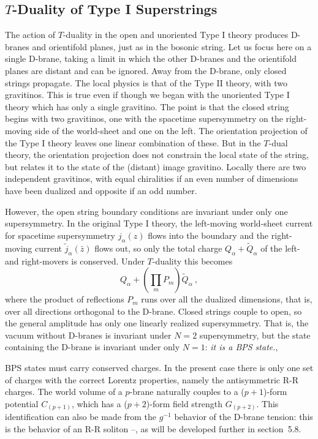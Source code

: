 \documentclass[12pt]{article}
\def\be{\begin{equation}}
\def\ee{\end{equation}}
\begin{document}
\subsection{$T$-Duality of Type I Superstrings}

The action of $T$-duality in the open and unoriented Type I theory
produces D-branes and orientifold planes, just as in the bosonic string. 
Let us focus here on a single D-brane, taking a limit
in which the other D-branes and the orientifold planes are
distant and can be ignored.  Away from the D-brane, only closed strings
propagate.  The local physics is that of the Type II theory, with two
gravitinos.  This is true even if though we began with the unoriented Type
I theory which has only a single gravitino.  The point is that the closed
string begins with two gravitinos, one with the spacetime
supersymmetry on the right-moving side of the world-sheet and one on the
left.  The orientation projection of the Type I theory leaves one linear
combination of these.  But in the $T$-dual theory, the
orientation projection does not constrain the local state of the string,
but relates it to the state of the (distant) image gravitino.
Locally there are two independent gravitinos, with equal chiralities if an
even number of dimensions have been dualized and opposite if an odd number.

However, the open string boundary conditions are invariant under only one
supersymmetry.  In the original Type I theory, the left-moving world-sheet
current for spacetime supersymmetry $j_\alpha(z)$ flows into the boundary
and the right-moving current $\tilde j_\alpha(\bar z)$ flows out, so
only the total charge $Q_\alpha + \tilde Q_\alpha$ of the
left- and right-movers is conserved.  Under $T$-duality this becomes
\be
Q_\alpha + \left({\textstyle \prod_m} P_m\right) \tilde Q_\alpha\ , 
\ee
where the product of reflections $P_m$ runs over
all the dualized dimensions, that is, over all directions orthogonal to the
D-brane.  Closed strings couple to open, so the general
amplitude has only one linearly realized supersymmetry.  That is, the vacuum
without D-branes is invariant under
$N=2$ supersymmetry, but the state containing the D-brane is invariant under
only $N=1$: {\it it is a BPS state.}\cite{joeone}, \cite{gdinst}

BPS states must carry conserved charges.  In the present case there is
only one set of charges with the correct Lorentz properties, namely the
antisymmetric R-R charges.  The world volume of a $p$-brane naturally
couples to a ($p + 1$)-form potential $C_{(p+1)}$, which has a
($p + 2$)-form field strength $G_{(p+2)}$.  This identification can also
be made from the $g^{-1}$ behavior of the D-brane tension: this is the
behavior of an R-R soliton \cite{blackp}--\cite{coni}, as will be
developed further in section~5.8.
\end{document}
